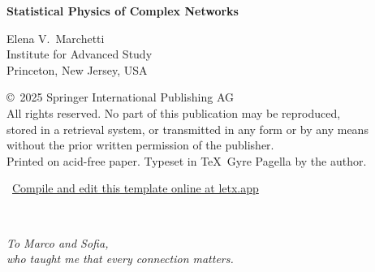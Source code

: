 \documentclass[a4paper,twoside,11pt]{book}
\begin{document}
\begin{center}
{\large\bfseries\color{accent} Statistical Physics of Complex Networks}

\vspace{8mm}
{\normalsize\color{textdark!70!black}
Elena V.\ Marchetti\\
Institute for Advanced Study\\
Princeton, New Jersey, USA}

\vspace{8mm}
{\small\color{textdark!60!black}
\copyright\ 2025 Springer International Publishing AG\\[4pt]
All rights reserved. No part of this publication may be reproduced,\\
stored in a retrieval system, or transmitted in any form or by any means\\
without the prior written permission of the publisher.\\[4pt]
Printed on acid-free paper. Typeset in \TeX\ Gyre Pagella by the author.}

\vspace{12mm}
{\footnotesize\sffamily\color{accent!50!black}
\ \href{https://letx.app}{Compile and edit this template online at letx.app}}
\end{center}

\newpage
\thispagestyle{empty}
\ 

\newpage
\thispagestyle{empty}
\vspace*{60mm}
\begin{flushright}
{\large\itshape\color{textdark!70!black}
To Marco and Sofia,\\[4pt]
who taught me that every connection matters.}
\end{flushright}

\frontmatter
\tableofcontents

\mainmatter











\end{document}
